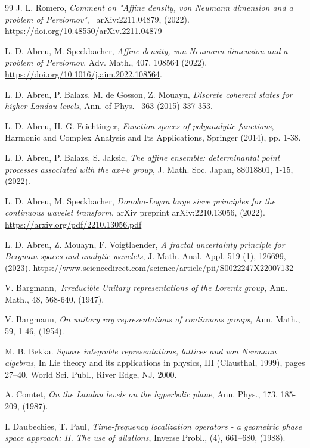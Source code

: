 \documentclass[11pt,reqno]{amsart}
\numberwithin{equation}{section}
\theoremstyle{plain}
\theoremstyle{definition}
\theoremstyle{remark}
\begin{document}
\begin{thebibliography}{99}
 J. L. Romero, \emph{Comment on "Affine density, von Neumann
dimension and a problem of Perelomov"}, \ arXiv:2211.04879, (2022). %
\url{https://doi.org/10.48550/arXiv.2211.04879}

 L. D. Abreu, M. Speckbacher, \emph{Affine density, von
Neumann dimension and a problem of Perelomov}, Adv. Math., 407, 108564
(2022). \url{https://doi.org/10.1016/j.aim.2022.108564}.

 L. D. Abreu, P. Balazs, M. de Gosson, Z. Mouayn, \emph{%
Discrete coherent states for higher Landau levels}, Ann. of Phys.\textsl{\ }%
363 (2015) 337-353.

 L. D. Abreu, H. G. Feichtinger, \emph{Function spaces of
polyanalytic functions}, Harmonic and Complex Analysis and Its Applications,
Springer (2014), pp. 1-38.

 L. D. Abreu, P. Balazs, S. Jaksic, \emph{The affine
ensemble: determinantal point processes associated with the ax+b group}, J.
Math. Soc. Japan, 88018801, 1-15, (2022).

 L. D. Abreu, M. Speckbacher, \emph{Donoho-Logan large sieve
principles for the continuous wavelet transform}, arXiv preprint
arXiv:2210.13056, (2022). \url{https://arxiv.org/pdf/2210.13056.pdf}

 L. D. Abreu, Z. Mouayn, F. Voigtlaender, \emph{A fractal
uncertainty principle for Bergman spaces and analytic wavelets}, J. Math.
Anal. Appl. 519 (1), 126699, (2023). %
\url{https://www.sciencedirect.com/science/article/pii/S0022247X22007132}\ \ 

 V. Bargmann,\emph{\ Irreducible Unitary representations of the
Lorentz group,} Ann. Math., 48, 568-640, (1947).

 V. Bargmann, \emph{On unitary ray representations of
continuous groups}, Ann. Math., 59, 1-46, (1954).

 M. B. Bekka. \emph{Square integrable representations,
lattices and von Neumann algebras}, In Lie theory and its applications in
physics, III (Clausthal, 1999), pages 27--40. World Sci. Publ., River Edge,
NJ, 2000.

 A. Comtet, \emph{On the Landau levels on the hyperbolic
plane}, Ann. Phys., 173, 185-209, (1987).

 I. Daubechies, T. Paul, \emph{Time-frequency localization
operators - a geometric phase space approach: II. The use of dilations},
Inverse Probl., (4), 661--680, (1988).


\end{thebibliography}
\end{document}
